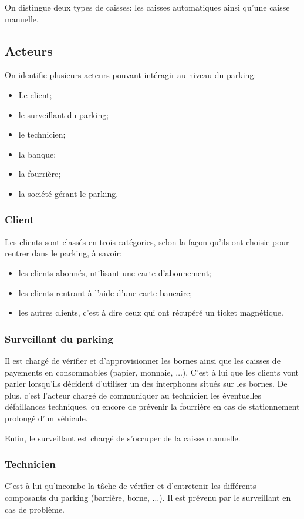 \documentclass[a4paper]{article}
\begin{document}
On distingue deux types de caisses: les caisses automatiques ainsi qu'une caisse
manuelle.

\subsection{Acteurs}
On identifie plusieurs acteurs pouvant int\'eragir au niveau du parking:
\begin{itemize}
	\item Le client;
	\item le surveillant du parking;
	\item le technicien;
	\item la banque;
	\item la fourri\`ere;
	\item la soci\'et\'e g\'erant le parking.
\end{itemize}

\subsubsection{Client}
Les clients sont class\'es en trois cat\'egories, selon la fa\c con qu'ils ont choisie
pour rentrer dans le parking, \`a savoir:
\begin{itemize}
	\item les clients abonn\'es, utilisant une carte d'abonnement;
	\item les clients rentrant \`a l'aide d'une carte bancaire;
	\item les autres clients, c'est \`a dire ceux qui ont r\'ecup\'er\'e un
		ticket magn\'etique.
\end{itemize}
\subsubsection{Surveillant du parking}
Il est charg\'e de v\'erifier et d'approvisionner les bornes ainsi que les caisses
de payements en consommables (papier, monnaie, $\hdots$). C'est \`a lui que les
clients vont parler lorsqu'ils d\'ecident d'utiliser un des interphones situ\'es sur
les bornes. De plus, c'est l'acteur charg\'e de communiquer au technicien les \'eventuelles
d\'efaillances techniques, ou encore de pr\'evenir la fourri\`ere en cas de stationnement
prolong\'e d'un v\'ehicule.

Enfin, le surveillant est charg\'e de s'occuper de la caisse manuelle.

\subsubsection{Technicien}
C'est \`a lui qu'incombe la t\^ache de v\'erifier et d'entretenir les diff\'erents
composants du parking (barri\`ere, borne, $\hdots$). Il est pr\'evenu par le surveillant
en cas de probl\`eme. 
\end{document}
